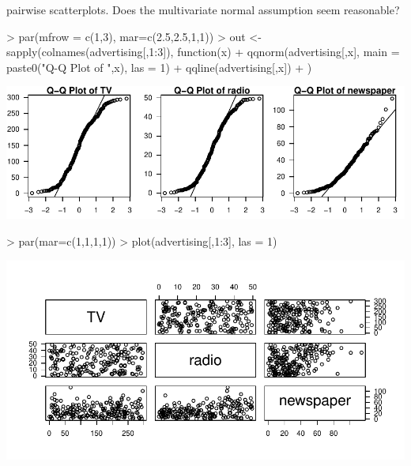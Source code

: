 \documentclass[12pt,a4paper]{paper}
\begin{document}
\begin{enumerate}
\begin{enumerate}
pairwise scatterplots. Does the multivariate normal assumption seem reasonable?
\begin{Schunk}
\begin{Sinput}
> par(mfrow = c(1,3), mar=c(2.5,2.5,1,1))
> out <- sapply(colnames(advertising[,1:3]), function(x){
+   qqnorm(advertising[,x], main = paste0("Q-Q Plot of ",x), las = 1)
+   qqline(advertising[,x])
+ })
\end{Sinput}
\end{Schunk}
\includegraphics{HW2_DanielOsorio-007}
\begin{Schunk}
\begin{Sinput}
> par(mar=c(1,1,1,1))
> plot(advertising[,1:3], las = 1)
\end{Sinput}
\end{Schunk}
\includegraphics{HW2_DanielOsorio-008}


\end{enumerate}
\end{enumerate}
\end{document}
